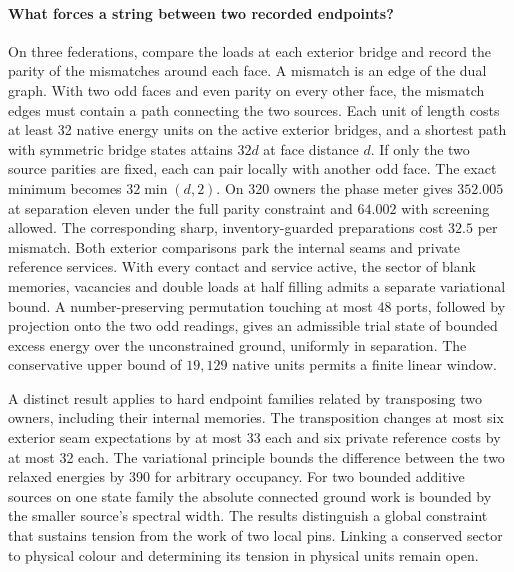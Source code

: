 \documentclass[11pt]{article}
\theoremstyle{definition}
\theoremstyle{remark}
\theoremstyle{plain}
\begin{document}
\paragraph{What forces a string between two recorded endpoints?}
On three federations, compare the loads at each exterior bridge and
record the parity of the mismatches around each face. A mismatch is
an edge of the dual graph. With two odd faces and even parity on
every other face, the mismatch edges must contain a path connecting
the two sources. Each unit of length costs at least 32 native energy
units on the active exterior bridges, and a shortest path with symmetric
bridge states attains $32d$ at face distance $d$. If only the two
source parities are fixed, each can pair locally with another odd face.
The exact minimum becomes $32\min(d,2)$. On 320 owners the phase
meter gives $352.005$ at separation eleven under the full parity
constraint and $64.002$ with screening allowed. The corresponding
sharp, inventory-guarded preparations cost $32.5$ per mismatch. Both exterior
comparisons park the internal seams and private reference services.
With every contact and service active, the sector of blank memories,
vacancies and double loads at half filling admits a separate variational
bound. A number-preserving permutation touching at most 48 ports,
followed by projection onto the two odd readings, gives an admissible
trial state of bounded excess energy over the unconstrained ground,
uniformly in separation. The conservative upper bound of $19{,}129$
native units permits a finite linear window.

A distinct result applies to hard endpoint families related by
transposing two owners, including their internal memories.
The transposition changes at most six exterior seam expectations
by at most 33 each and six private reference costs by at most 32
each. The variational principle bounds the difference between the
two relaxed energies by 390 for arbitrary occupancy. For two bounded
additive sources on one state family the absolute connected ground
work is bounded by the smaller source's spectral width. The results
distinguish a global constraint that sustains tension from the work
of two local pins. Linking a conserved sector to physical colour and
determining its tension in physical units remain open.
\end{document}
